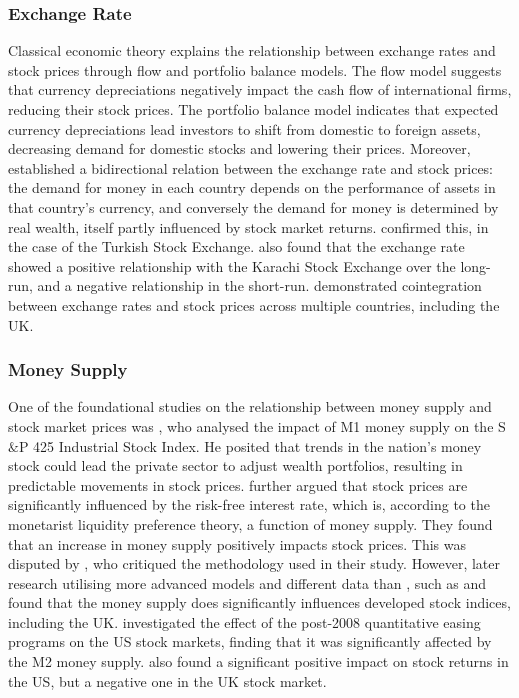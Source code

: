 \documentclass[11pt,a4paper]{article}
\newcommand{\citeboth}[1]{\citeauthor{#1} \citep{#1}}
\begin{document}
\subsubsection{Exchange Rate}

Classical economic theory explains the relationship between exchange rates and stock prices through flow and portfolio balance models. The flow model suggests that currency depreciations negatively impact the cash flow of international firms, reducing their stock prices. The portfolio balance model indicates that expected currency depreciations lead investors to shift from domestic to foreign assets, decreasing demand for domestic stocks and lowering their prices. 
Moreover, \citeboth{branson1977} established a bidirectional relation between the exchange rate and stock prices: the demand for money in each country depends on the performance of assets in that country’s currency, and conversely the demand for money is determined by real wealth, itself partly influenced by stock market returns. 
\citeboth{aydemir2009} confirmed this, in the case of the Turkish Stock Exchange. 
\citeboth{khan2018} also found that the exchange rate showed a positive relationship with the Karachi Stock Exchange over the long-run, and a negative relationship in the short-run. 
\citeboth{wong2022} demonstrated cointegration between exchange rates and stock prices across multiple countries, including the UK.

\subsubsection{Money Supply}

One of the foundational studies on the relationship between money supply and 
stock market prices was \citeboth{palmer1970}, who analysed the impact of M1 money supply on the S$\&$P 425 Industrial Stock Index. 
He posited that trends in the nation's money stock could lead the 
private sector to adjust wealth portfolios, resulting in 
predictable movements in stock prices. \citeboth{homa1971} further argued that 
stock prices are significantly influenced by the risk-free interest rate, 
which is, according to the monetarist liquidity preference theory, a 
function of money supply. They found that an increase in money supply 
positively impacts stock prices. This was disputed by \citeboth{pesando1974}, 
who critiqued the methodology used in their study. 
However, later research utilising more advanced models and different data than \citeboth{palmer1970}, such as \citeboth{bahloul2017} and 
\citeboth{synek2024} found that the money supply does significantly influences developed stock indices, including the UK. 
\citeboth{pícha2017}
investigated the effect of the post-2008 quantitative easing programs on the US stock markets, finding 
that it was significantly affected by the M2 money supply. 
\citeboth{olawale2014} also found a significant positive impact on stock returns in the US, but a negative one in the UK stock market. 
\end{document}
